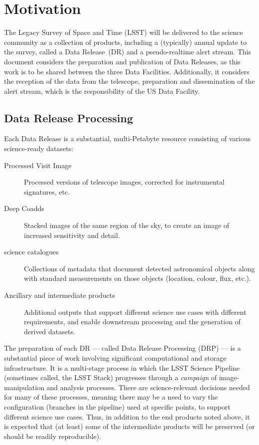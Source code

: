 \section{Motivation}
\label{sec:motivation}

The Legacy Survey of Space and Time (LSST) will be delivered to the science community as a collection of products, including a (typically) annual update to the survey, called a Data Release~(DR) and a pseudo-realtime alert stream. This document considers the preparation and publication of Data Releases, as this work is to be shared between the three Data Facilities. Additionally, it considers the reception of the data from the telescope, preparation and dissemination of the alert stream, which is the responsibility of the US Data Facility.

\subsection{Data Release Processing}

Each Data Release is a substantial, multi-Petabyte resource consisting of various science-ready datasets:

\begin{description}

\item[Processed Visit Image] Processed versions of telescope images, corrected for instrumental signatures, etc.

\item[Deep Coadds] Stacked images of the same region of the sky, to create an image of increased sensitivity and detail.

\item[science catalogues] Collections of metadata that document detected astronomical objects along with standard measurements on those objects (location, colour, flux, etc.).

\item[Ancillary and intermediate products] Additional outputs that support different science use cases with different requirements, and enable downstream processing and the generation of derived datasets.

\end{description}

The preparation of each DR --- called Data Release Processing (DRP) --- is a substantial piece of work involving significant computational and storage infrastructure. It is a multi-stage process in which the LSST Science Pipeline (sometimes called, the LSST Stack) progresses through a {\em campaign} of image-manipulation and analysis processes. There are science-relevant decisions needed for many of these processes, meaning there may be a need to vary the configuration (branches in the pipeline) used at specific points, to support different science use cases. Thus, in addition to the end products noted above, it is expected that (at least) some of the intermediate products will be preserved (or should be readily reproducible).

